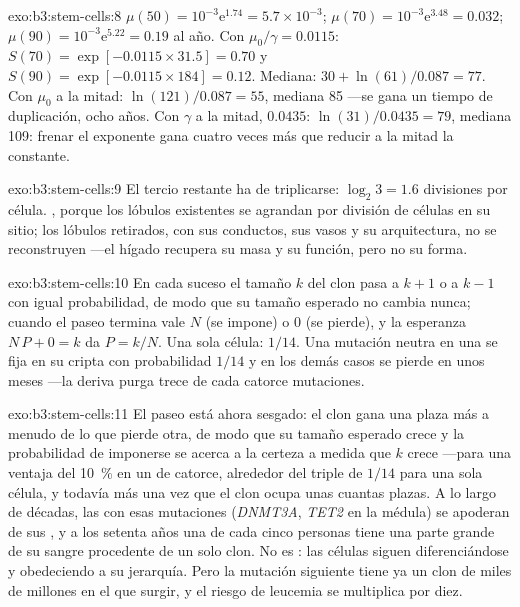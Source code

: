 \begin{solution}{exo:b3:stem-cells:8}
$\mu(50) = 10^{-3}\mathrm{e}^{1.74} = 5.7\times 10^{-3}$; $\mu(70) =
10^{-3}\mathrm{e}^{3.48} = 0.032$; $\mu(90) = 10^{-3}\mathrm{e}^{5.22} =
0.19$ al año. Con $\mu_{0}/\gamma = 0.0115$: $S(70) = \exp[-0.0115
\times 31.5] = 0.70$ y $S(90) = \exp[-0.0115\times 184] = 0.12$.
Mediana: $30 + \ln(61)/0.087 = 77$. Con $\mu_{0}$ a la mitad:
$\ln(121)/0.087 = 55$, mediana 85 ---se gana un tiempo de duplicación,
ocho años. Con $\gamma$ a la mitad, $0.0435$: $\ln(31)/0.0435 = 79$,
mediana 109: frenar el exponente gana cuatro veces más que reducir a la
mitad la constante.
\end{solution}

\begin{solution}{exo:b3:stem-cells:9}
El tercio restante ha de triplicarse: $\log_{2}3 = 1.6$ divisiones por
célula. , porque los lóbulos existentes se
agrandan por división de células en su sitio; los lóbulos retirados,
con sus conductos, sus vasos y su arquitectura, no se reconstruyen ---el
hígado recupera su masa y su función, pero no su forma.
\end{solution}

\begin{solution}{exo:b3:stem-cells:10}
En cada suceso el tamaño $k$ del clon pasa a $k + 1$ o a $k - 1$ con
igual probabilidad, de modo que su tamaño esperado no cambia nunca;
cuando el paseo termina vale $N$ (se impone) o $0$ (se pierde), y la
esperanza $N\,P + 0 = k$ da $P = k/N$. Una sola célula: $1/14$. Una
mutación neutra en una  se fija en su cripta con
probabilidad $1/14$ y en los demás casos se pierde en unos meses ---la
deriva purga trece de cada catorce mutaciones.
\end{solution}

\begin{solution}{exo:b3:stem-cells:11}
El paseo está ahora sesgado: el clon gana una plaza más a menudo de lo
que pierde otra, de modo que su tamaño esperado crece y la probabilidad
de imponerse se acerca a la certeza a medida que $k$ crece ---para una
ventaja del \qty{10}{\%} en un  de catorce, alrededor del triple
de $1/14$ para una sola célula, y todavía más una vez que el clon ocupa
unas cuantas plazas. A lo largo de décadas, las  con esas
mutaciones (\emph{DNMT3A}, \emph{TET2} en la médula) se apoderan de sus
, y a los setenta años una de cada cinco personas tiene una parte
grande de su sangre procedente de un solo clon. No es : las
células siguen diferenciándose y obedeciendo a su jerarquía. Pero la
mutación siguiente tiene ya un clon de miles de millones en el que
surgir, y el riesgo de leucemia se multiplica por diez.
\end{solution}


